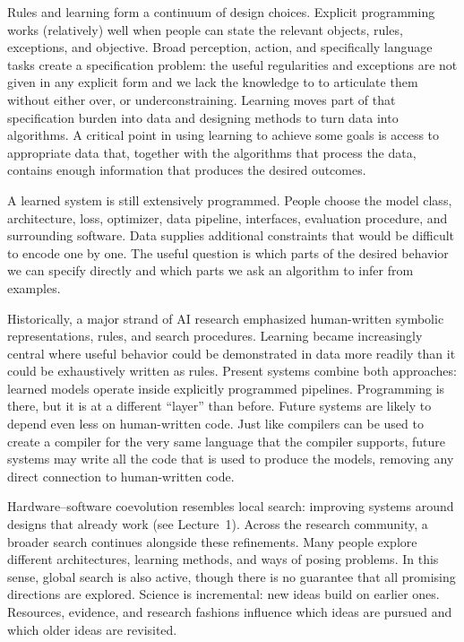 \documentclass[11pt,twoside]{article}
\theoremstyle{definition}
\theoremstyle{remark}
\begin{document}
Rules and learning form a continuum of design choices.
Explicit programming works (relatively) well when people can state the relevant objects,
rules, exceptions, and objective. Broad perception, action, and specifically
language tasks create
a specification problem: the useful regularities and exceptions are not
given in any explicit form and we lack the knowledge to
to articulate them without either over, or underconstraining.
Learning moves part of that specification burden into data and designing methods
to turn data into algorithms. A critical point in using learning to achieve
some goals is access to appropriate data that, together with the algorithms that process the data,
contains enough information that produces the desired outcomes.

A learned system is still extensively programmed. People choose the model
class, architecture, loss, optimizer, data pipeline, interfaces, evaluation
procedure, and surrounding software. Data supplies additional constraints that
would be difficult to encode one by one. The useful question is which parts of
the desired behavior we can specify directly and which parts we ask an
algorithm to infer from examples.

Historically, a major strand of AI research emphasized human-written symbolic
representations, rules, and search procedures. Learning became increasingly
central where useful behavior could be demonstrated in data more readily than
it could be exhaustively written as rules. Present systems combine both
approaches: learned models operate inside explicitly programmed pipelines.
Programming is there, but it is at a different ``layer''
than before. Future systems are likely to depend even less on human-written code.
Just like compilers can be used to create a compiler for the very same language
that the compiler supports,
future systems may write all the code that is used to produce the models,
removing any direct connection to human-written code.

Hardware--software coevolution resembles local search: improving systems
around designs that already work (see Lecture~1). Across the research
community, a broader search continues alongside these refinements. Many people
explore different architectures, learning methods, and ways of posing problems.
In this sense, global search is also active, though there is no guarantee that
all promising directions are explored. Science is incremental: new ideas build
on earlier ones. Resources, evidence, and research fashions influence which
ideas are pursued and which older ideas are revisited.
\end{document}
